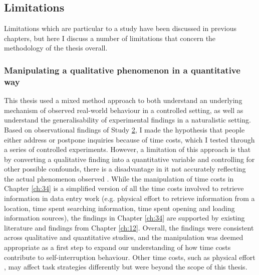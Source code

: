 \subsection{Limitations}
Limitations which are particular to a study have been discussed in previous chapters, but here I discuss a number of limitations that concern the methodology of the thesis overall. 

\subsubsection{Manipulating a qualitative phenomenon in a quantitative way}
This thesis used a mixed method approach to both understand an underlying mechanism of observed real-world behaviour in a controlled setting, as well as understand the generalisability of experimental findings in a naturalistic setting. Based on observational findings of Study \hyperref[st:Study2]{2}, I made the hypothesis that people either address or postpone inquiries because of time costs, which I tested through a series of controlled experiments. However, a limitation of this approach is that by converting a qualitative finding into a quantitative variable and controlling for other possible confounds, there is a disadvantage in it not accurately reflecting the actual phenomenon observed \citep{Driscoll2007}. While the manipulation of time costs in Chapter \ref{ch:34} is a simplified version of all the time costs involved to retrieve information in data entry work (e.g. physical effort to retrieve information from a location, time spent searching information, time spent opening and loading information sources), the findings in Chapter \ref{ch:34} are supported by existing literature and findings from Chapter \ref{ch:12}. Overall, the findings were consistent across qualitative and quantitative studies, and the manipulation was deemed appropriate as a first step to expand our understanding of how time costs contribute to self-interruption behaviour. Other time costs, such as physical effort \citep{Potts2017}, may affect task strategies differently but were beyond the scope of this thesis. 



